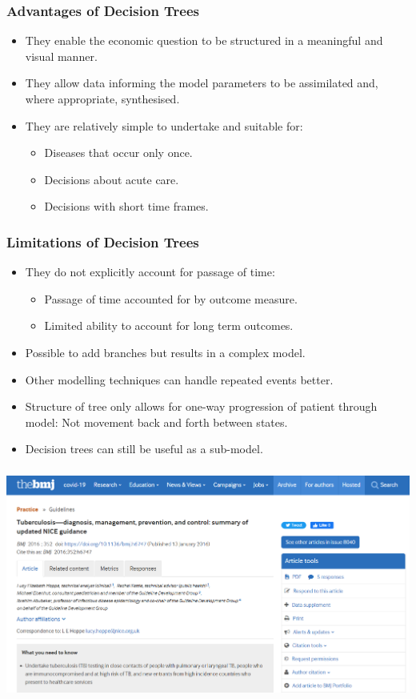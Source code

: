 \begin{frame}
\frametitle{Advantages of Decision Trees}

	\begin{itemize}
		\item They enable the economic question to be structured in a \alert{meaningful} and \alert{visual} manner.
		\pause
		\item  They allow data informing the model parameters to be assimilated and, where appropriate, synthesised.
		\pause
		\item They are relatively simple to undertake and suitable for:
		\begin{itemize}
			\item Diseases that occur only once.
			\item Decisions about acute care.
			\item Decisions with short time frames.
		\end{itemize}
	\end{itemize}
\end{frame}


\begin{frame}
\frametitle{Limitations of Decision Trees}

	\begin{itemize}
		\item They do not explicitly account for passage of time:
			\begin{itemize}
				\item Passage of time accounted for by outcome measure.
				\item Limited ability to account for long term outcomes.
			\end{itemize}
			\pause
		\item Possible to add branches but results in a complex model.
		\item Other modelling techniques can handle repeated events better.
		\item Structure of tree only allows for one-way progression of patient through model: Not movement back and forth between states.
		\item Decision trees can still be useful as a sub-model.
		\end{itemize}
\end{frame}


\begin{frame}
\frametitle{}
 \includegraphics[width=1\textwidth,height=1.2\textheight, keepaspectratio]{decision-trees/figs/nice-guidance}
\end{frame} 

